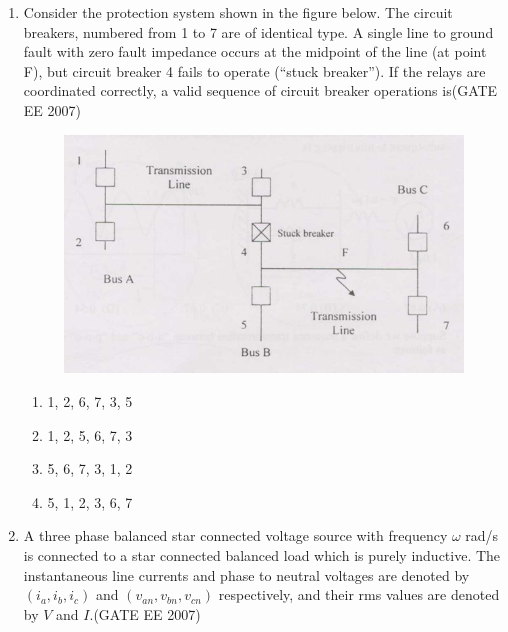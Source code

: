 \documentclass[a4paper,10pt]{exam}
\theoremstyle{remark}
\begin{document}
\begin{enumerate}
\begin{multicols}{4}
\begin{enumerate}
 \item 122 km
\item 172km
\item 222km
\item 272km
\end{enumerate}
\end{multicols}
\vfill
{}\\
\vspace{1cm}
\newpage

\item  \quad
Consider the protection system shown in the figure below. The circuit breakers, numbered from 1 to 7 are of identical type. A single line to ground fault with zero fault impedance occurs at the midpoint of the line (at point F), but circuit breaker 4 fails to operate (\textquotedblleft stuck breaker\textquotedblright). If the relays are coordinated correctly, a valid sequence of circuit breaker operations is\hfill{(GATE EE 2007)} 

\begin{figure}[H]
    \centering
    \includegraphics[width=0.75\linewidth]{figs/Q 28 2007.png} 
    \caption{}
    \label{fig:myfigure}
\end{figure}
\begin{multicols}{4}
\begin{enumerate}
 \item 1, 2, 6, 7, 3, 5 
\item  1, 2, 5, 6, 7, 3 
\item 5, 6, 7, 3, 1, 2 
\item 5, 1, 2, 3, 6, 7
\end{enumerate}
\end{multicols}

\item \quad
A three phase balanced star connected voltage source with frequency $\omega$ rad/s is connected to a star connected balanced load which is purely inductive. The instantaneous line currents and phase to neutral voltages are denoted by $(i_a, i_b, i_c)$ and $(v_{an}, v_{bn}, v_{cn})$ respectively, and their rms values are denoted by $V$ and $I$.\hfill{(GATE EE 2007)} 


\end{enumerate}
\end{document}
